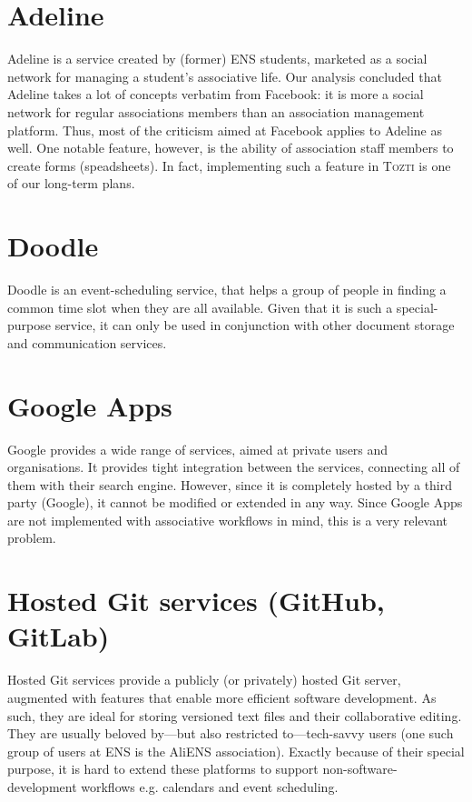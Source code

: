 \documentclass[a4paper, english]{report}
\newcommand{\tozti}{\textsc{Tozti}\xspace}
\begin{document}
\section{Adeline}
Adeline is a service created by (former) ENS students, marketed as a social network for managing a student's associative life. Our analysis concluded that Adeline takes a lot of concepts verbatim from Facebook: it is more a social network for regular associations members than an association management platform. Thus, most of the criticism aimed at Facebook applies to Adeline as well. One notable feature, however, is the ability of association staff members to create forms (speadsheets). In fact, implementing such a feature in \tozti is one of our long-term plans.

\section{Doodle}
Doodle is an event-scheduling service, that helps a group of people in finding a common time slot when they are all available. Given that it is such a special-purpose service, it can only be used in conjunction with other document storage and communication services.

\section{Google Apps}
Google provides a wide range of services, aimed at private users and organisations. It provides tight integration between the services, connecting all of them with their search engine. However, since it is completely hosted by a third party (Google), it cannot be modified or extended in any way. Since Google Apps are not implemented with associative workflows in mind, this is a very relevant problem.

\section{Hosted Git services (GitHub, GitLab)}
Hosted Git services provide a publicly (or privately) hosted Git server, augmented with features that enable more efficient software development. As such, they are ideal for storing versioned text files and their collaborative editing. They are usually beloved by---but also restricted to---tech-savvy users (one such group of users at ENS is the AliENS association). Exactly because of their special purpose, it is hard to extend these platforms to support non-software-development workflows e.g. calendars and event scheduling.
\end{document}
